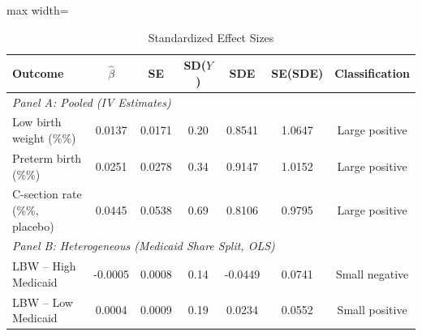 \begin{table}[htbp]
\centering
\begin{threeparttable}
\caption{Standardized Effect Sizes}
\label{tab:sde}
\begin{adjustbox}{max width=\textwidth}
\begin{tabular}{lcccccc}
\hline\hline
Outcome & $\hat{\beta}$ & SE & SD($Y$) & SDE & SE(SDE) & Classification \\
\hline
\multicolumn{7}{l}{\textit{Panel A: Pooled (IV Estimates)}} \\[3pt]
Low birth weight (\%\%) & 0.0137 & 0.0171 & 0.20 & 0.8541 & 1.0647 & Large positive \\
Preterm birth (\%\%) & 0.0251 & 0.0278 & 0.34 & 0.9147 & 1.0152 & Large positive \\
C-section rate (\%\%, placebo) & 0.0445 & 0.0538 & 0.69 & 0.8106 & 0.9795 & Large positive \\[6pt]
\multicolumn{7}{l}{\textit{Panel B: Heterogeneous (Medicaid Share Split, OLS)}} \\[3pt]
LBW -- High Medicaid & -0.0005 & 0.0008 & 0.14 & -0.0449 & 0.0741 & Small negative \\
LBW -- Low Medicaid & 0.0004 & 0.0009 & 0.19 & 0.0234 & 0.0552 & Small positive \\
\hline\hline
\end{tabular}
\end{adjustbox}
\begin{tablenotes}[flushleft]
\footnotesize

\end{tablenotes}
\end{threeparttable}
\end{table}

